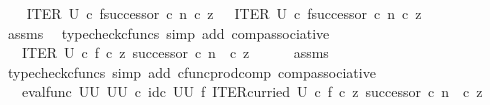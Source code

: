\begin{isabellebody}
\ \ \isamarkupfalse%
\ {\isachardoublequoteopen}{\isacharparenleft}{\kern0pt}ITER\ U\ {\isasymcirc}\isactrlsub c\ {\isasymlangle}f{\isacharcomma}{\kern0pt}successor\ {\isasymcirc}\isactrlsub c\ n{\isasymrangle}{\isacharparenright}{\kern0pt}\ {\isasymcirc}\isactrlsub c\ z\ \ {\isacharequal}{\kern0pt}\ ITER\ U\ {\isasymcirc}\isactrlsub c\ {\isasymlangle}f{\isacharcomma}{\kern0pt}successor\ {\isasymcirc}\isactrlsub c\ n{\isasymrangle}\ {\isasymcirc}\isactrlsub c\ z{\isachardoublequoteclose}\isanewline
\ \ \ \ \isamarkupfalse%
\ assms\ \isamarkupfalse%
\ {\isacharparenleft}{\kern0pt}typecheck{\isacharunderscore}{\kern0pt}cfuncs{\isacharcomma}{\kern0pt}\ simp\ add{\isacharcolon}{\kern0pt}\ comp{\isacharunderscore}{\kern0pt}associative{}{\isacharparenright}{\kern0pt}\isanewline
\ \ \isamarkupfalse%
\ \isamarkupfalse%
\ {\isachardoublequoteopen}{\isachardot}{\kern0pt}{\isachardot}{\kern0pt}{\isachardot}{\kern0pt}\ {\isacharequal}{\kern0pt}\ ITER\ U\ {\isasymcirc}\isactrlsub c\ {\isasymlangle}f\ {\isasymcirc}\isactrlsub c\ z{\isacharcomma}{\kern0pt}\ successor\ {\isasymcirc}\isactrlsub c\ {\isacharparenleft}{\kern0pt}n\ \ {\isasymcirc}\isactrlsub c\ z{\isacharparenright}{\kern0pt}{\isasymrangle}{\isachardoublequoteclose}\isanewline
\ \ \ \ \isamarkupfalse%
\ assms\ \isamarkupfalse%
\ {\isacharparenleft}{\kern0pt}typecheck{\isacharunderscore}{\kern0pt}cfuncs{\isacharcomma}{\kern0pt}\ simp\ add{\isacharcolon}{\kern0pt}\ cfunc{\isacharunderscore}{\kern0pt}prod{\isacharunderscore}{\kern0pt}comp\ comp{\isacharunderscore}{\kern0pt}associative{}{\isacharparenright}{\kern0pt}\isanewline
\ \ \isamarkupfalse%
\ \isamarkupfalse%
\ {\isachardoublequoteopen}{\isachardot}{\kern0pt}{\isachardot}{\kern0pt}{\isachardot}{\kern0pt}\ {\isacharequal}{\kern0pt}\ {\isacharparenleft}{\kern0pt}eval{\isacharunderscore}{\kern0pt}func\ {\isacharparenleft}{\kern0pt}U\isactrlbsup U\isactrlesup {\isacharparenright}{\kern0pt}\ {\isacharparenleft}{\kern0pt}U\isactrlbsup U\isactrlesup {\isacharparenright}{\kern0pt}{\isacharparenright}{\kern0pt}\ {\isasymcirc}\isactrlsub c\ {\isacharparenleft}{\kern0pt}id\isactrlsub c\ {\isacharparenleft}{\kern0pt}U\isactrlbsup U\isactrlesup {\isacharparenright}{\kern0pt}\ {\isasymtimes}\isactrlsub f\ ITER{\isacharunderscore}{\kern0pt}curried\ U{\isacharparenright}{\kern0pt}\ {\isasymcirc}\isactrlsub c\ {\isasymlangle}f\ {\isasymcirc}\isactrlsub c\ z{\isacharcomma}{\kern0pt}\ successor\ {\isasymcirc}\isactrlsub c\ {\isacharparenleft}{\kern0pt}n\ \ {\isasymcirc}\isactrlsub c\ z{\isacharparenright}{\kern0pt}{\isasymrangle}{\isachardoublequoteclose}\isanewline

\end{isabellebody}
